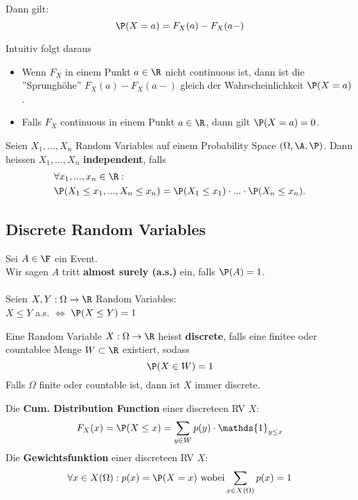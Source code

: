 Dann gilt:
$$\P(X = a) = F_X(a) - F_X(a-)$$

Intuitiv folgt daraus
\begin{itemize}
    \item Wenn $F_X$ in einem Punkt $a \in \R$ nicht continuous ist, dann ist die ''Sprunghöhe'' $F_X(a)-F_X(a-)$ gleich der Wahrscheinlichkeit $\P(X = a)$.
    \item Falls $F_X$ continuous in einem Punkt $a \in \R$, dann gilt $\P(X = a) = 0$. 
\end{itemize}

\begin{mainbox}{}
    Seien $X_1, ...,X_n$ Random Variables auf einem Probability Space $(\Omega, \A, \P)$. Dann heissen $X_1, ...,X_n$ \textbf{independent}, falls
    \begin{align*}
        &\forall x_1, ..., x_n \in \R:\\
        &\P(X_1 \leq x_1, ..., X_n \leq x_n) = \P(X_1 \leq x_1)\cdot ... \cdot \P(X_n \leq x_n).
    \end{align*} 
\end{mainbox}


\subsection{Discrete Random Variables}
Sei $A \in \F$ ein Event.\\
Wir sagen $A$ tritt \textbf{almost surely (a.s.)} ein, falls $\P(A)= 1$.
\\ \\
Seien $X, Y: \Omega \to \R$ Random Variables: \\$X \leq Y$ a.s. $\iff$ $\P(X \leq Y)=1$


\begin{mainbox}{}
    Eine Random Variable $X: \Omega \to \R$ heisst \textbf{discrete}, falls eine finitee oder countablee Menge $W \subset \R$ existiert, sodass
    $$\P(X \in W) = 1$$
    Falls $\Omega$ finite oder countable ist, dann ist $X$ immer discrete.
\end{mainbox}
Die \textbf{Cum. Distribution Function} einer discreteen RV $X$: $$F_X(x)= \P(X \leq x)= \sum_{y\in W}p(y)\cdot \mathds{1}_{y\leq x}$$
Die \textbf{Gewichtsfunktion} einer discreteen RV $X$: $$\forall x \in X(\Omega): p(x)= \P(X=x) \text{ wobei} \sum_{x \in X(\Omega)}p(x)= 1$$

